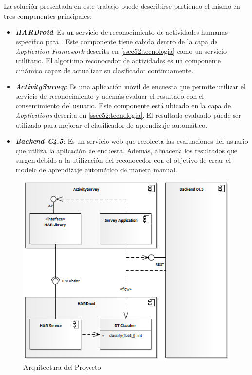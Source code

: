 \label{sec53:arquitectura}La solución presentada en este trabajo
puede describirse partiendo el mismo en tres componentes principales:
\begin{itemize}
\item \textbf{\emph{HARDroid}}: Es un servicio de reconocimiento de actividades
humanas específico para \emph{}. Este componente tiene
cabida dentro de la capa de \emph{Application Framework} descrita
en \ref{ssec52:tecnologia} como un servicio utilitario. El algoritmo
reconocedor de actividades es un componente dinámico capaz de actualizar
su clasificador continuamente.
\item \textbf{\emph{ActivitySurvey}}: Es una aplicación móvil de encuesta
que permite utilizar el servicio de reconocimiento y además evaluar
el resultado con el consentimiento del usuario. Este componente está
ubicado en la capa de \emph{Applications} descrita en \ref{ssec52:tecnologia}.
El resultado evaluado puede ser utilizado para mejorar el clasificador
de aprendizaje automático.
\item \textbf{\emph{Backend C4.5}}: Es un servicio web  que
recolecta las evaluaciones del usuario que utiliza la aplicación de
encuesta. Además, almacena los resultados que surgen debido a la utilización
del reconocedor con el objetivo de crear el modelo de aprendizaje
automático de manera manual. 
\end{itemize}
\begin{figure}[H]
\begin{centering}
\includegraphics[width=1\columnwidth]{capitulo-5/graphics/arqui_general}
\par\end{centering}
\caption[Arquitectura del Proyecto]{\label{fig5:arqui-general}Arquitectura del Proyecto}

\end{figure}

